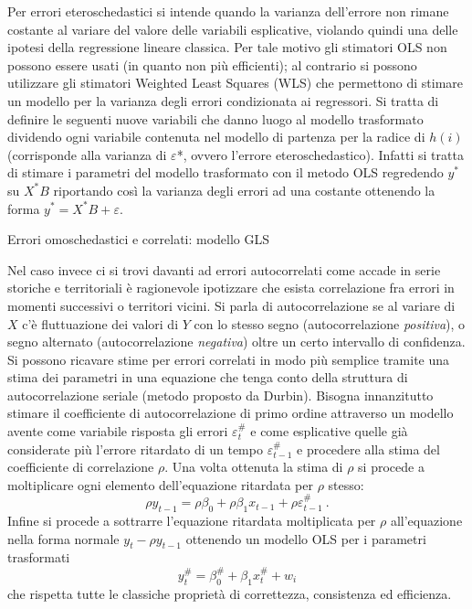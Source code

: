 \documentclass[a4page, 11pt]{article} %
\begin{document}
Per errori eteroschedastici si intende quando la varianza dell’errore non rimane costante al variare del valore delle variabili esplicative, violando quindi una delle ipotesi della regressione lineare classica. Per tale motivo gli stimatori OLS non possono essere usati (in quanto non più efficienti); al contrario si possono utilizzare gli stimatori Weighted Least Squares (WLS) che permettono di stimare un modello per la varianza degli errori condizionata ai regressori. 
Si tratta di definire le seguenti nuove variabili che danno luogo al modello trasformato dividendo ogni variabile contenuta nel modello di partenza per la radice di $h(i)$ (corrisponde alla varianza di $\varepsilon$*, ovvero l'errore eteroschedastico). 
Infatti si tratta di stimare i parametri del modello trasformato con il metodo OLS regredendo $y^*$ su $X^*B$ riportando così la varianza degli errori ad una costante ottenendo la forma $y^* = X^*B + \varepsilon$.
\newline
\begin{itshape}
Errori omoschedastici e correlati: modello GLS
\end{itshape}

Nel caso invece ci si trovi davanti ad errori autocorrelati come accade in serie storiche e territoriali è ragionevole ipotizzare che esista correlazione fra errori in momenti successivi o territori vicini. Si parla di autocorrelazione se al variare di $X$ c'è fluttuazione dei valori di $Y$ con lo stesso segno (autocorrelazione \textit{positiva}), o segno alternato (autocorrelazione \textit{negativa}) oltre un certo intervallo di confidenza. Si possono ricavare stime per errori correlati in modo più semplice tramite una stima dei parametri in una equazione che tenga conto della struttura di autocorrelazione seriale (metodo proposto da Durbin). 
Bisogna innanzitutto stimare il coefficiente di autocorrelazione di primo ordine attraverso un modello avente come variabile risposta gli errori $\varepsilon_t^\#$ e come esplicative quelle già considerate più l’errore ritardato di un tempo $\varepsilon_{t-1}^\#$ e procedere alla stima del coefficiente di correlazione $\rho$. Una volta ottenuta la stima di $\rho$ si procede a moltiplicare ogni elemento dell'equazione ritardata per $\rho$ stesso: 
\begin{equation*}
\rho y_{t-1} = \rho\beta_0 + \rho\beta_1 x_{t-1} +\rho\varepsilon_{t-1}^\# \ .
\end{equation*}
Infine si procede a sottrarre l'equazione ritardata moltiplicata per $\rho$ all'equazione nella forma normale $y_t - \rho y_{t-1}$ ottenendo un modello OLS per i parametri trasformati 
\begin{equation*}
y_t^\# = \beta_0^\# + \beta_1 x_t^\# + w_i
\end{equation*} 
che rispetta tutte le classiche proprietà di correttezza, consistenza ed efficienza. 
\end{document}
